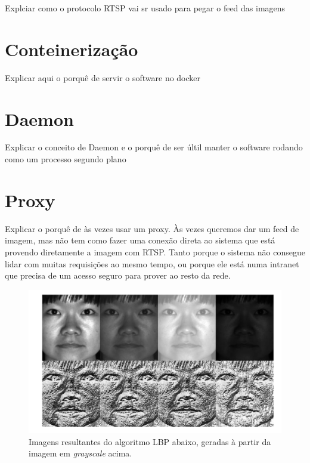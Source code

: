 \documentclass[12pt, %
openright, 
oneside, %
a4paper,    %
brazil]{facom-ufu-abntex2}
\begin{document}
Explciar como o protocolo RTSP vai sr usado para pegar o feed das imagens

\section{Conteinerização}

Explicar aqui o porquê de servir o software no docker

\section{Daemon}

Explicar o conceito de Daemon e o porquê de ser últil manter o software rodando
como um processo segundo plano

\section{Proxy}

Explicar o porquê de às vezes usar um proxy. Às vezes queremos dar um feed de
imagem, mas não tem como fazer uma conexão direta ao sistema que está provendo
diretamente a imagem com RTSP. Tanto porque o sistema não consegue lidar com
muitas requisições ao mesmo tempo, ou porque ele está numa intranet que precisa
de um acesso seguro para prover ao resto da rede.

\begin{figure}[!ht]
	\centering
	\includegraphics[width=0.7\linewidth]{grayscale.PNG}
	\caption[De \emph{grayscale} para LBP
	]{Imagens resultantes do algoritmo LBP abaixo, geradas à partir da imagem em \emph{grayscale} acima.}
	\label{fig:graficosVariandoTamanhoRede}
\end{figure}
\end{document}
